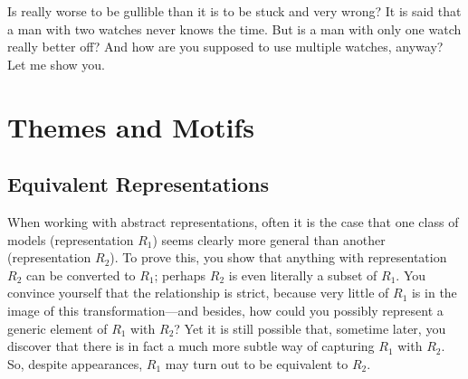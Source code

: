 %
Is really worse to be gullible than it is to be stuck and very wrong? 
It is said that a man with two watches never knows the time.  
But is a man with only one watch really better off?
And how are you supposed to use multiple watches, anyway?
Let me show you. 


\section{Themes and Motifs}

% 


%
\subsection{Equivalent Representations}


When working with abstract representations, often it is the case that one class of models (representation $R_1$) seems clearly more general than another (representation $R_2$).
To prove this, you show that anything with representation $R_2$ can be converted to $R_1$; perhaps $R_2$ is even literally a subset of $R_1$. 
You convince yourself that the relationship is strict, because very little of $R_1$ is in the image of this transformation---and besides, how could you possibly represent a generic element of $R_1$ with $R_2$? 
Yet it is still possible that, sometime later,
you discover that there is in fact a much more subtle way of capturing $R_1$ with $R_2$. 
So, despite appearances, $R_1$ may turn out to be equivalent to $R_2$. 

